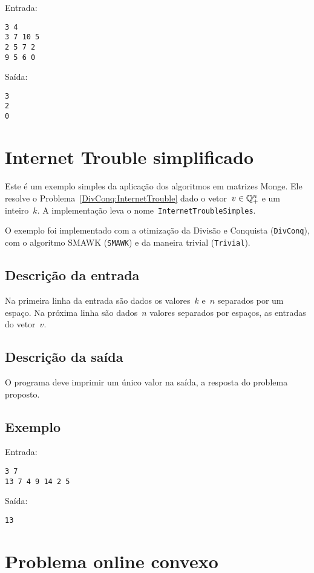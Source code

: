 Entrada:
\begin{verbatim}
3 4
3 7 10 5
2 5 7 2
9 5 6 0
\end{verbatim}
Saída:
\begin{verbatim}
3
2
0
\end{verbatim}

\section{Internet Trouble simplificado} \label{InternetTroubleSimples}

Este é um exemplo simples da aplicação dos algoritmos em matrizes Monge. Ele resolve o Problema~\ref{DivConq:InternetTrouble} dado o vetor~$v \in \mathbb{Q}^{n}_+$ e um inteiro~$k$. A implementação leva o nome~\texttt{InternetTroubleSimples}.

O exemplo foi implementado com a otimização da Divisão e Conquista (\texttt{DivConq}), com o algoritmo SMAWK (\texttt{SMAWK}) e da maneira trivial (\texttt{Trivial}).

\subsection*{Descrição da entrada}

Na primeira linha da entrada são dados os valores~$k$ e~$n$ separados por um espaço. Na próxima linha são dados~$n$ valores separados por espaços, as entradas do vetor~$v$.

\subsection*{Descrição da saída}

O programa deve imprimir um único valor na saída, a resposta do problema proposto.

\subsection*{Exemplo}

Entrada:
\begin{verbatim}
3 7
13 7 4 9 14 2 5
\end{verbatim}
Saída:
\begin{verbatim}
13
\end{verbatim}


\section{Problema online convexo} \label{ProblemaOnlineConvexo}


